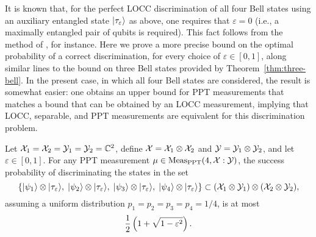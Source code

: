 It is known that, for the perfect LOCC discrimination of all four Bell states
using an auxiliary entangled state $\lvert\mspace{0.5mu} \tau_{\varepsilon} \mspace{0.5mu} \rangle$ as above,
one requires that $\varepsilon = 0$ (i.e., a maximally entangled pair of qubits
is required).
This fact follows from the method of \cite{Horodecki03}, for instance.
Here we prove a more precise bound on the optimal probability of a correct
discrimination, for every choice of $\varepsilon\in[0,1]$, along similar lines
to the bound on three Bell states provided by Theorem~\ref{thm:three-bell}.
In the present case, in which all four Bell states are considered, the result
is somewhat easier: one obtains an upper bound for PPT measurements that
matches a bound that can be obtained by an LOCC measurement,
implying that LOCC, separable, and PPT measurements are equivalent for this
discrimination problem.

\begin{theorem}
  \label{thm:four-bell}
  Let $\mathcal{X}_1 = \mathcal{X}_2 = \mathcal{Y}_1 = \mathcal{Y}_2 = \mathbb{C}^2$, define
  $\mathcal{X} = \mathcal{X}_1 \otimes \mathcal{X}_2$ and $\mathcal{Y} = \mathcal{Y}_1 \otimes \mathcal{Y}_2$, and let
  $\varepsilon\in [0,1]$.
  For any PPT measurement $\mu\in\mathrm{Meas}_{\mathrm{PPT}}(4,\mathcal{X}:\mathcal{Y})$, the success
  probability of discriminating the states in the set
  \begin{equation}
    \label{eq:set-four-bells}
    \left\{ \lvert\mspace{0.5mu} \psi_{1} \mspace{0.5mu} \rangle \otimes \lvert\mspace{0.5mu} \tau_{\varepsilon} \mspace{0.5mu} \rangle,\; 
    \lvert\mspace{0.5mu} \psi_{2} \mspace{0.5mu} \rangle \otimes \lvert\mspace{0.5mu} \tau_{\varepsilon} \mspace{0.5mu} \rangle,\;
    \lvert\mspace{0.5mu} \psi_{3} \mspace{0.5mu} \rangle \otimes \lvert\mspace{0.5mu} \tau_{\varepsilon} \mspace{0.5mu} \rangle,\; 
    \lvert\mspace{0.5mu} \psi_{4} \mspace{0.5mu} \rangle \otimes \lvert\mspace{0.5mu} \tau_{\varepsilon} \mspace{0.5mu} \rangle\right\} 
    \subset (\mathcal{X}_1\otimes\mathcal{Y}_1)\otimes(\mathcal{X}_2\otimes\mathcal{Y}_2),
  \end{equation}
  assuming a uniform distribution $p_1 = p_2 = p_3 = p_4 = 1/4$, is at most
  \begin{equation}
    \label{eq:probability-four-bell}
    \frac{1}{2}\left(1 + \sqrt{1 - \varepsilon^2}\right).
  \end{equation}
\end{theorem}

